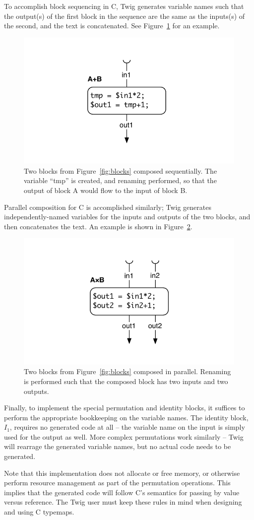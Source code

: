 To accomplish block sequencing in C, Twig generates variable names such that the output(s) of the first block in the sequence are the same as the inputs(s) of the second, and the text is concatenated. See Figure~\ref{fig:codegen-seq} for an example.

\begin{figure}[ht]
\centering
\includegraphics[width=0.75\columnwidth]{images/code-gen2}
\caption{Two blocks from Figure~\ref{fig:blocks} composed sequentially. The variable ``tmp'' is created, and renaming performed, so that the output of block A would flow to the input of block B.}
\label{fig:codegen-seq}
\end{figure}

Parallel composition for C is accomplished similarly; Twig generates independently-named variables for the inputs and outputs of the two blocks, and then concatenates the text. An example is shown in Figure~\ref{fig:codegen-par}.

\begin{figure}[ht]
\centering
\includegraphics[width=0.75\columnwidth]{images/code-gen3}
\caption{Two blocks from Figure~\ref{fig:blocks} composed in parallel. Renaming is performed such that the composed block has two inputs and two outputs.}
\label{fig:codegen-par}
\end{figure}

Finally, to implement the special permutation and identity blocks, it suffices to perform the appropriate bookkeeping on the variable names. The identity block, $I_1$, requires no generated code at all -- the variable name on the input is simply used for the output as well. More complex permutations work similarly -- Twig will rearrage the generated variable names, but no actual code needs to be generated.

Note that this implementation does not allocate or free memory, or otherwise perform resource management as part of the permutation operations. This implies that the generated code will follow C's semantics for passing by value versus reference. The Twig user must keep these rules in mind when designing and using C typemaps.
